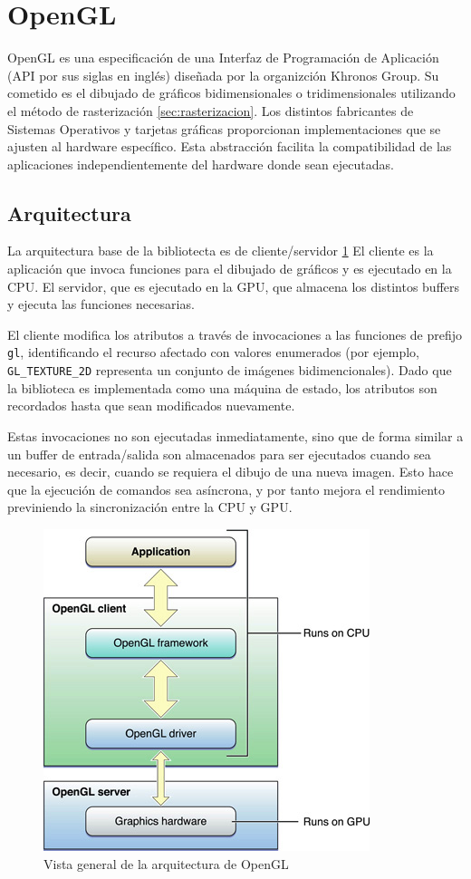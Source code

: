 \section{OpenGL}
OpenGL es una especificación de una Interfaz de Programación de Aplicación (API por sus siglas en inglés) diseñada por la organizción Khronos Group. Su cometido es el dibujado de gráficos bidimensionales o tridimensionales utilizando el método de rasterización \ref{sec:rasterizacion}. Los distintos fabricantes de Sistemas Operativos y tarjetas gráficas proporcionan implementaciones que se ajusten al hardware específico. Esta abstracción facilita la compatibilidad de las aplicaciones independientemente del hardware donde sean ejecutadas.

\subsection{Arquitectura}
La arquitectura base de la bibliotecta es de cliente/servidor \ref{img:gpucpugl} El cliente es la aplicación que invoca funciones para el dibujado de gráficos y es ejecutado en la CPU. El servidor, que es ejecutado en la GPU, que almacena los distintos buffers y ejecuta las funciones necesarias.

El cliente modifica los atributos a través de invocaciones a las funciones de prefijo \verb|gl|, identificando el recurso afectado con valores enumerados (por ejemplo, \verb|GL_TEXTURE_2D| representa un conjunto de imágenes bidimencionales). Dado que la biblioteca es implementada como una máquina de estado, los atributos son recordados hasta que sean modificados nuevamente.

Estas invocaciones no son ejecutadas inmediatamente, sino que de forma similar a un buffer de entrada/salida son almacenados para ser ejecutados cuando sea necesario, es decir, cuando se requiera el dibujo de una nueva imagen. Esto hace que la ejecución de comandos sea asíncrona, y por tanto mejora el rendimiento previniendo la sincronización entre la CPU y GPU.

\vspace{5mm}
\begin{figure}[h]
	\centering
	\includegraphics[width=.7\linewidth]{assets/cpu_gpu}
	\caption{Vista general de la arquitectura de OpenGL}
	\label{img:gpucpugl}
\end{figure}

